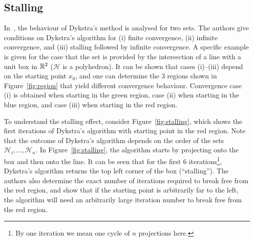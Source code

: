 \documentclass[hidelinks]{article}
\newtheorem{remark}{Remark}
\begin{document}

\subsection{Stalling}

In~\cite{DYKSTRASTALLING}, the behaviour of Dykstra's method is analysed for two sets. The authors give conditions on Dykstra's algorithm for (i) finite convergence, (ii) infinite convergence, and (iii) stalling followed by infinite convergence. A specific example is given for the case that the set is provided by the intersection of a line with a unit box in $\mathbb{R}^2$ ($\mathcal{H}$ is a polyhedron). It can be shown that cases (i)--(iii) depend on the starting point $x_0$, and one can determine the 3 regions shown in Figure~\ref{fig:region} that yield different convergence behaviour. Convergence case (i) is obtained when starting in the green region, case (ii) when starting in the blue region, and case (iii) when starting in the red region.

To understand the stalling effect, consider Figure~\ref{fig:stalling}, which shows the first iterations of Dykstra's algorithm with starting point in the red region. Note that the outcome of Dykstra's algorithm depends on the order of the sets $\mathcal{H}_i,\dots,\mathcal{H}_n$. In Figure~\ref{fig:stalling}, the algorithm starts by projecting onto the box and then onto the line. It can be seen that for the first 6 iterations\footnote{By one iteration we mean one cycle of $n$ projections here.}, Dykstra's algorithm returns the top left corner of the box (``stalling''). The authors also determine the exact number of iterations required to break free from the red region, and show that if the starting point is arbitrarily far to the left, the algorithm will need an arbitrarily large iteration number to break free from the red region.
\end{document}
